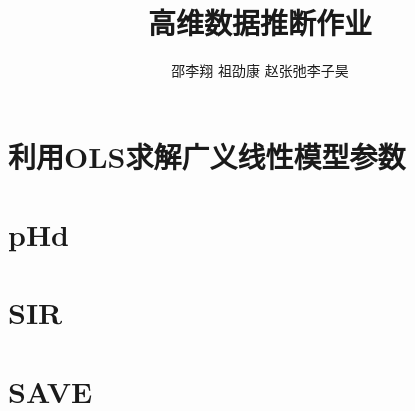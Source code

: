 \documentclass[cn,11pt]{elegantpaper}
\title{高维数据推断作业}
\author{邵李翔 \quad 祖劭康 \quad 赵张弛\quad 李子昊}
\date{}
\begin{document}
    


\maketitle
\newpage
\tableofcontents

\newpage
\section{利用OLS求解广义线性模型参数}



\section{pHd}

 \section{SIR}
 
 \section{SAVE}

 
\end{document}
